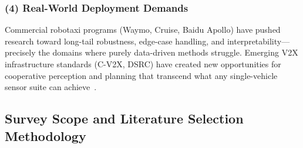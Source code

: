 \documentclass[12pt, a4paper]{article}
\begin{document}
\subsubsection*{(4) Real-World Deployment Demands}
Commercial robotaxi programs (Waymo, Cruise, Baidu Apollo) have pushed
research toward long-tail robustness, edge-case handling, and
interpretability---precisely the domains where purely data-driven methods
struggle.  Emerging V2X infrastructure standards (C-V2X, DSRC) have
created new opportunities for cooperative perception and planning that
transcend what any single-vehicle sensor suite can
achieve~\cite{wang2020v2vnet}.

\subsection{Survey Scope and Literature Selection Methodology}
\label{sec:scope}
\end{document}
